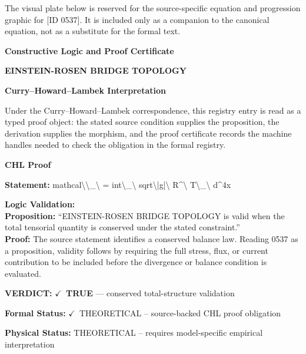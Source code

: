 \begingroup\footnotesize\sloppy
The visual plate below is reserved for the source-specific equation and progression graphic for [ID 0537]. It is included only as a companion to the canonical equation, not as a substitute for the formal text.
\par\endgroup
\ifTZPDarkEdition
{}
\fi

\clearpage
\begingroup\tzpsupportsetup
\noindent\textbf{\fontsize{10.8pt}{12.8pt}\selectfont [ID 0537] Constructive Logic and Proof Certificate}\par
\noindent\textbf{\fontsize{10pt}{12pt}\selectfont EINSTEIN-ROSEN BRIDGE TOPOLOGY}\par
\vspace{0.45em}
\begingroup
\footnotesize
\setlength{\parskip}{0.22em}
\setlength{\parindent}{0pt}
\noindent\textbf{Curry--Howard--Lambek Interpretation}\par
Under the Curry--Howard--Lambek correspondence, this registry entry is read as a typed proof
object: the stated source condition supplies the proposition, the derivation supplies the
morphism, and the proof certificate records the machine handles needed to check the obligation
in the formal registry.

\vspace{0.45em}
\noindent\textbf{CHL Proof}\par
\textbf{Statement:} mathcal\textbackslash{}\textbackslash{}\_\textbackslash{} = int\textbackslash{}\_\textbackslash{} sqrt\textbackslash{}|g|\textbackslash{} R\textasciicircum{}\textbackslash{} T\textbackslash{}\_\textbackslash{} d\textasciicircum{}4x

\textbf{Logic Validation:}\\
\textbf{Proposition:} ``EINSTEIN-ROSEN BRIDGE TOPOLOGY is valid when the total tensorial quantity is conserved
under the stated constraint.''\\
\textbf{Proof:} The source statement identifies a conserved balance law. Reading 0537 as a proposition,
validity follows by requiring the full stress, flux, or current contribution to be
included before the divergence or balance condition is evaluated.

\textbf{VERDICT:} \ensuremath{\checkmark}\ \textbf{TRUE} --- conserved total-structure validation

\textbf{Formal Status:} \ensuremath{\checkmark}\ THEORETICAL -- source-backed CHL proof obligation

\textbf{Physical Status:} THEORETICAL -- requires model-specific empirical interpretation
\par\vspace{0.45em}
\par
\ifTZPDarkEdition
{}
\fi
\endgroup
\endgroup
